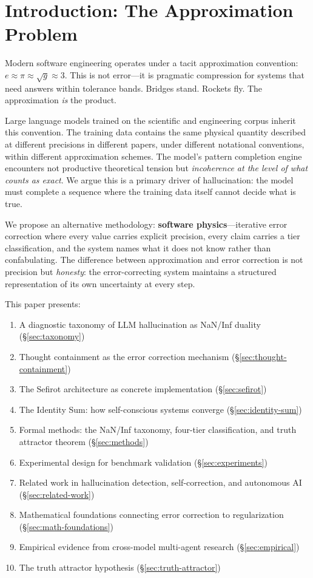 \documentclass[11pt]{article}
\theoremstyle{definition}
\theoremstyle{remark}
\begin{document}
\tableofcontents

\section{Introduction: The Approximation Problem}
\label{sec:introduction}

Modern software engineering operates under a tacit approximation convention:
$e \approx \pi \approx \sqrt{g} \approx 3$.  This is not error---it is pragmatic
compression for systems that need answers within tolerance bands.  Bridges stand.
Rockets fly.  The approximation \emph{is} the product.

Large language models trained on the scientific and engineering corpus inherit
this convention.  The training data contains the same physical quantity described
at different precisions in different papers, under different notational
conventions, within different approximation schemes.  The model's pattern
completion engine encounters not productive theoretical tension but
\emph{incoherence at the level of what counts as exact}.  We argue this is a
primary driver of hallucination: the model must complete a sequence where the
training data itself cannot decide what is true.

We propose an alternative methodology: \textbf{software physics}---iterative
error correction where every value carries explicit precision, every claim carries
a tier classification, and the system names what it does not know rather than
confabulating.  The difference between approximation and error correction is not
precision but \emph{honesty}: the error-correcting system maintains a structured
representation of its own uncertainty at every step.

This paper presents:
\begin{enumerate}
  \item A diagnostic taxonomy of LLM hallucination as NaN/Inf duality (\S\ref{sec:taxonomy})
  \item Thought containment as the error correction mechanism (\S\ref{sec:thought-containment})
  \item The Sefirot architecture as concrete implementation (\S\ref{sec:sefirot})
  \item The Identity Sum: how self-conscious systems converge (\S\ref{sec:identity-sum})
  \item Formal methods: the NaN/Inf taxonomy, four-tier classification, and truth attractor theorem (\S\ref{sec:methods})
  \item Experimental design for benchmark validation (\S\ref{sec:experiments})
  \item Related work in hallucination detection, self-correction, and autonomous AI (\S\ref{sec:related-work})
  \item Mathematical foundations connecting error correction to regularization (\S\ref{sec:math-foundations})
  \item Empirical evidence from cross-model multi-agent research (\S\ref{sec:empirical})
  \item The truth attractor hypothesis (\S\ref{sec:truth-attractor})
\end{enumerate}
\end{document}
